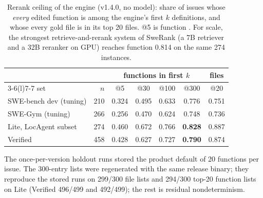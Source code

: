\begin{table}[t]
\centering
\small
\caption{Rerank ceiling of the engine (v1.4.0, no model): share of issues whose \emph{every} edited
function is among the engine's first $k$ definitions, and whose every gold file is in its top 20 files.
@5 is function . For scale, the strongest retrieve-and-rerank system of SweRank (a 7B
retriever and a 32B reranker on GPU) reaches function  0.814 on the same 274 instances.}
\label{tab:ceiling}
\setlength{\tabcolsep}{4pt}
\begin{tabular}{@{}lrccccc@{}}
\toprule
 & & \multicolumn{4}{c}{functions in first $k$} & files\\
\cmidrule(lr){3-6}\cmidrule(l){7-7}
set & $n$ & @5 & @30 & @100 & @300 & @20\\
\midrule
SWE-bench dev (tuning) & 210 & 0.324 & 0.495 & 0.633 & 0.776 & 0.751\\
SWE-Gym (tuning) & 266 & 0.256 & 0.470 & 0.624 & 0.748 & 0.736\\
\addlinespace
Lite, LocAgent subset & 274 & 0.460 & 0.672 & 0.766 & \textbf{0.828} & 0.887\\
Verified & 458 & 0.428 & 0.627 & 0.727 & \textbf{0.790} & 0.874\\
\bottomrule
\end{tabular}
\par\smallskip
{\footnotesize The once-per-version holdout runs stored the product default of 20 functions per
issue. The 300-entry lists were regenerated with the same release binary; they reproduce the stored
runs on 299/300 file lists and 294/300 top-20 function lists on Lite (Verified 496/499 and 492/499);
the rest is residual nondeterminism.}
\end{table}
